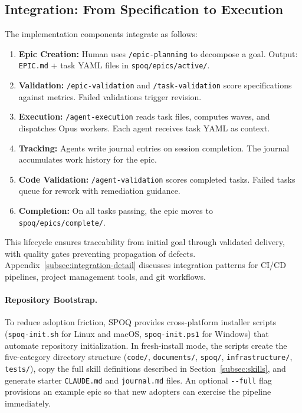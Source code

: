 \newpage
\subsection{Integration: From Specification to Execution}
\label{subsec:integration}

The implementation components integrate as follows:

\begin{enumerate}
    \item \textbf{Epic Creation:} Human uses \texttt{/epic-planning} to decompose
    a goal. Output: \texttt{EPIC.md} + task YAML files in \texttt{spoq/epics/active/}.

    \item \textbf{Validation:} \texttt{/epic-validation} and \texttt{/task-validation}
    score specifications against metrics. Failed validations trigger revision.

    \item \textbf{Execution:} \texttt{/agent-execution} reads task files, computes
    waves, and dispatches Opus workers. Each agent receives task YAML as context.

    \item \textbf{Tracking:} Agents write journal entries on session completion.
    The journal accumulates work history for the epic.

    \item \textbf{Code Validation:} \texttt{/agent-validation} scores completed
    tasks. Failed tasks queue for rework with remediation guidance.

    \item \textbf{Completion:} On all tasks passing, the epic moves to
    \texttt{spoq/epics/complete/}.
\end{enumerate}

This lifecycle ensures traceability from initial goal through validated
delivery, with quality gates preventing propagation of defects.
Appendix~\ref{subsec:integration-detail} discusses integration patterns
for CI/CD pipelines, project management tools, and git workflows.

\paragraph{Repository Bootstrap.}
To reduce adoption friction, SPOQ provides cross-platform installer
scripts (\texttt{spoq-init.sh} for Linux and macOS, \texttt{spoq-init.ps1}
for Windows) that automate repository initialization. In fresh-install mode,
the scripts create the five-category directory structure
(\texttt{code/}, \texttt{documents/}, \texttt{spoq/}, \texttt{infrastructure/},
\texttt{tests/}), copy the full skill definitions described in
Section~\ref{subsec:skills}, and generate starter \texttt{CLAUDE.md} and
\texttt{journal.md} files. An optional \texttt{-{}-full} flag provisions an
example epic so that new adopters can exercise the pipeline immediately.

